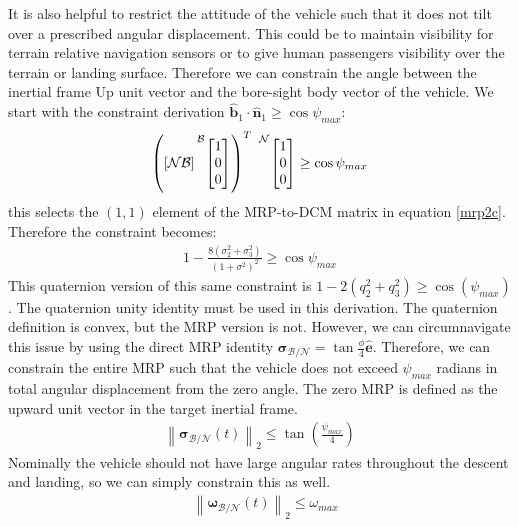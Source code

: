 It is also helpful to restrict the attitude of the vehicle such that it does not tilt over a prescribed angular displacement. This could be to maintain visibility for terrain relative navigation sensors or to give human passengers visibility over the terrain or landing surface. Therefore we can constrain the angle between the inertial frame Up unit vector and the bore-sight body vector of the vehicle. We start with the constraint derivation $\hat{\bm{b}}_1 \cdot \hat{\bm{n}}_1 \geq \cos{\psi_{max}}$:
\begin{align}
	\left (
	[\mathcal{NB}]
	\prescript{\mathcal{B}}{}{
	\begin{bmatrix}
		1 \\ 0 \\ 0
	\end{bmatrix}}
	\right )^T \
	\prescript{\mathcal{N}}{}{
	\begin{bmatrix}
		1 \\  0 \\ 0
	\end{bmatrix}}
	\geq \cos{\psi_{max}}
\end{align}
this selects the $(1,1)$ element of the MRP-to-DCM matrix in equation \ref{mrp2c}. Therefore the constraint becomes:
%
\begin{align}
\label{alignconstraint}
	1- \frac{8(\sigma_2^2 + \sigma_3^2)}{(1+\sigma^2)^2} \geq \cos{\psi_{max}}
\end{align}
This quaternion version of this same constraint is $1-2(q_{2}^{2}+q_{3}^{2}) \geq \cos(\psi_{max})$. The quaternion unity identity must be used in this derivation. The quaternion definition is convex, but the MRP version is not. However, we can circumnavigate this issue by using the direct MRP identity $\boldsymbol{\sigma}_\mathcal{B/N} = \tan\frac{\phi}{4}\hat{\bm{e}}$. Therefore, we can constrain the entire MRP such that the vehicle does not exceed $\psi_{max}$ radians in total angular displacement from the zero angle. The zero MRP is defined as the upward unit vector in the target inertial frame.
\begin{align}
	\left \lVert \boldsymbol{\sigma}_\mathcal{B/N} (t) \right \lVert_2 \leq \tan \left( \frac{\psi_{max}}{4} \right)
\end{align}
Nominally the vehicle should not have large angular rates throughout the descent and landing, so we can simply constrain this as well.
\begin{align}
& \left \lVert \bm{\omega}_\mathcal{B/N}(t) \right \lVert_2 \leq \omega_{max}
\end{align}

